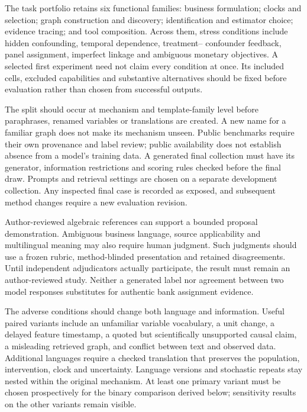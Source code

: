 The task portfolio retains six functional families: business
formulation; clocks and selection; graph construction and discovery;
identification and estimator choice; evidence tracing; and tool
composition. Across them, stress conditions include hidden confounding,
temporal dependence, treatment-- confounder feedback, panel assignment,
imperfect linkage and ambiguous monetary objectives. A selected first
experiment need not claim every condition at once. Its included cells,
excluded capabilities and substantive alternatives should be fixed
before evaluation rather than chosen from successful outputs.

The split should occur at mechanism and template-family level before
paraphrases, renamed variables or translations are created. A new name
for a familiar graph does not make its mechanism unseen. Public
benchmarks require their own provenance and label review; public
availability does not establish absence from a model's training data. A
generated final collection must have its generator, information
restrictions and scoring rules checked before the final draw. Prompts
and retrieval settings are chosen on a separate development collection.
Any inspected final case is recorded as exposed, and subsequent method
changes require a new evaluation revision.

Author-reviewed algebraic references can support a bounded proposal
demonstration. Ambiguous business language, source applicability and
multilingual meaning may also require human judgment. Such judgments
should use a frozen rubric, method-blinded presentation and retained
disagreements. Until independent adjudicators actually participate, the
result must remain an author-reviewed study. Neither a generated label
nor agreement between two model responses substitutes for authentic bank
assignment evidence.

The adverse conditions should change both language and information.
Useful paired variants include an unfamiliar variable vocabulary, a unit
change, a delayed feature timestamp, a quoted but scientifically
unsupported causal claim, a misleading retrieved graph, and conflict
between text and observed data. Additional languages require a checked
translation that preserves the population, intervention, clock and
uncertainty. Language versions and stochastic repeats stay nested within
the original mechanism. At least one primary variant must be chosen
prospectively for the binary comparison derived below; sensitivity
results on the other variants remain visible.

